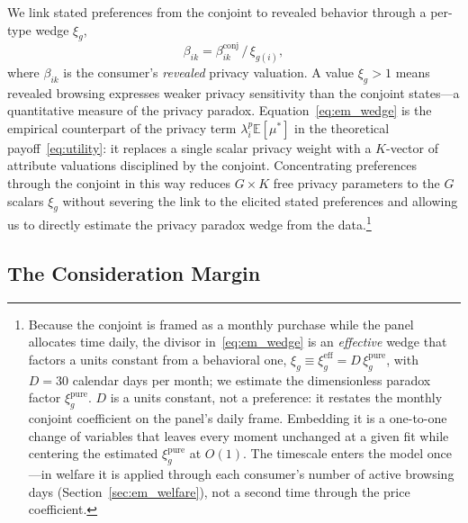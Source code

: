 \documentclass[12pt]{article}
\theoremstyle{definition}
\theoremstyle{remark}
\begin{document}
{We link stated preferences from the conjoint to revealed behavior through a per-type wedge $\xi_g$,
\begin{equation}\label{eq:em_wedge}
  \beta_{ik} = \beta^{\text{conj}}_{ik} \, / \, \xi_{g(i)},
\end{equation}
where $\beta_{ik}$ is the consumer's \emph{revealed} privacy valuation. A value $\xi_g > 1$ means revealed browsing expresses weaker privacy sensitivity than the conjoint states---a quantitative measure of the privacy paradox. Equation~\eqref{eq:em_wedge} is the empirical counterpart of the privacy term $\lambda^p_i \mathbb{E}[\mu^*]$ in the theoretical payoff~\eqref{eq:utility}: it replaces a single scalar privacy weight with a $K$-vector of attribute valuations disciplined by the conjoint. Concentrating preferences through the conjoint in this way reduces $G \times K$ free privacy parameters to the $G$ scalars $\xi_g$ without severing the link to the elicited stated preferences and allowing us to directly estimate the privacy paradox wedge from the data.\footnote{Because the conjoint is framed as a monthly purchase while the panel allocates time daily, the divisor in~\eqref{eq:em_wedge} is an \emph{effective} wedge that factors a units constant from a behavioral one, $\xi_g \equiv \xi^{\text{eff}}_g = D\,\xi^{\text{pure}}_g$, with $D = 30$ calendar days per month; we estimate the dimensionless paradox factor $\xi^{\text{pure}}_g$. $D$ is a units constant, not a preference: it restates the monthly conjoint coefficient on the panel's daily frame. Embedding it is a one-to-one change of variables that leaves every moment unchanged at a given fit while centering the estimated $\xi^{\text{pure}}_g$ at $O(1)$. The timescale enters the model once---in welfare it is applied through each consumer's number of active browsing days (Section~\ref{sec:em_welfare}), not a second time through the price coefficient.} 

\subsection{The Consideration Margin}

}
\end{document}
